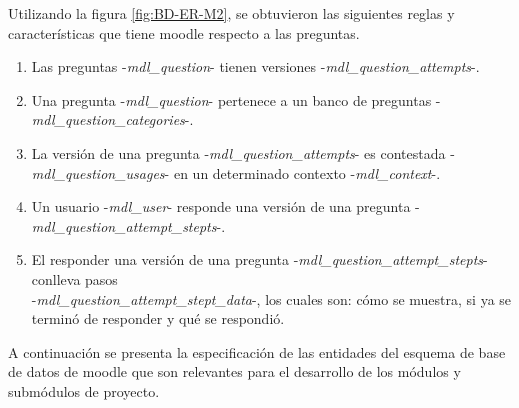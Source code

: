\clearpage




\noindent Utilizando la figura \ref{fig:BD-ER-M2}, se obtuvieron las siguientes reglas y características que tiene moodle respecto a las preguntas.
\begin{enumerate}
    \item Las preguntas -{\it mdl\_question}- tienen versiones -{\it mdl\_question\_attempts}-.
    \item Una pregunta -{\it mdl\_question}- pertenece a un banco de preguntas -{\it mdl\_question\_categories}-.
    \item La versión de una pregunta -{\it mdl\_question\_attempts}- es contestada -{\it mdl\_question\_usages}- en un determinado contexto -{\it mdl\_context}-.
    \item Un usuario -{\it mdl\_user}- responde una versión de una pregunta -{\it mdl\_question\_attempt\_stepts}-.
    \item El responder una versión de una pregunta -{\it mdl\_question\_attempt\_stepts}- conlleva pasos\\ -{\it mdl\_question\_attempt\_stept\_data}-, los cuales son: cómo se muestra, si ya se terminó de responder y qué se respondió.
\end{enumerate}


 A continuación se presenta la especificación de las entidades del esquema de base
 de datos de moodle que son relevantes para el desarrollo de los módulos y submódulos
 de proyecto.

